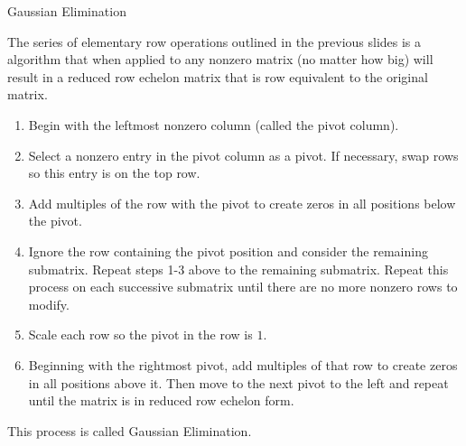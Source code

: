 \documentclass[xcolor=dvipsnames,aspectratio=169,t]{beamer}
\begin{document}
\begin{frame}{Gaussian Elimination}

  {\small
  The series of elementary row operations outlined in the previous slides is a algorithm that when applied to any nonzero matrix (no matter how big) will result in a reduced row echelon matrix that is row equivalent to the original matrix.
  
  \begin{enumerate}
    \item Begin with the leftmost nonzero column (called the \alert{pivot column}).
    \item Select a nonzero entry in the pivot column as a \alert{pivot}. If necessary, swap rows so this entry is on the top row.
    \item Add multiples of the row with the pivot to create zeros in all positions below the pivot.  
    \item Ignore the row containing the pivot position and consider the remaining submatrix. Repeat steps 1-3 above to the remaining submatrix. Repeat this process on each successive submatrix until there are no more nonzero rows to modify.
    \item Scale each row so the pivot in the row is $1$.
    \item Beginning with the rightmost pivot, add multiples of that row to create zeros in all positions above it. Then move to the next pivot to the left and repeat until the matrix is in reduced row echelon form.
  \end{enumerate}

This process is called \alert{Gaussian Elimination}. }

\end{frame}
\end{document}
